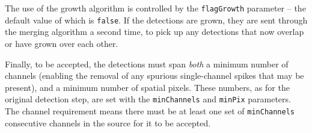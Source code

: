 The use of the growth algorithm is controlled by the
\texttt{flagGrowth} parameter -- the default value of which is
\texttt{false}. If the detections are grown, they are sent through the
merging algorithm a second time, to pick up any detections that now
overlap or have grown over each other.

Finally, to be accepted, the detections must span \emph{both} a
minimum number of channels (enabling the removal of any spurious
single-channel spikes that may be present), and a minimum number of
spatial pixels. These numbers, as for the original detection step, are
set with the \texttt{minChannels} and \texttt{minPix} parameters. The
channel requirement means there must be at least one set of
\texttt{minChannels} consecutive channels in the source for it to be
accepted.
